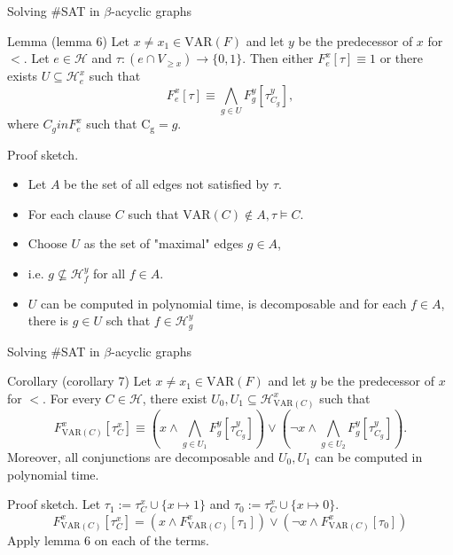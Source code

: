 \begin{frame}[t]{Solving \#SAT in $\beta$-acyclic graphs}
	\begin{block}{Lemma (lemma 6)}
		Let $x \neq x_1 \in \mathrm{VAR}(F)$ and let $y$ be the predecessor of $x$ for $<$.  Let $e \in \mathcal{H}$ and $\tau : (e \cap V_{\geq x}) \rightarrow \{0, 1\}$. Then either $F^x_e[\tau] \equiv 1$ or there exists $U \subseteq \mathcal{H}^x_e$ such that 
		$$ F^x_e[\tau] \equiv \bigwedge\limits_{g \in U} F^y_g[\tau^y_{C_g}],$$
		where $C_g in F^x_e$ such that $\mathrm{C_g} = g$.
	\end{block}
	\pause
	Proof sketch.
	\begin{itemize}[<+->]
		\item Let $A$ be the set of all edges not satisfied by $\tau$. 
		\item For each clause $C$ such that $\mathrm{VAR}(C) \notin A, \tau \models C$.
		\item Choose $U$ as the set of "maximal" edges $g \in A$,
		\item[]\hspace{1cm}i.e. $g \not \subseteq \mathcal{H}^y_f$ for all $f \in A$.
		\item $U$ can be computed in polynomial time, is decomposable and for each $f \in A$, there is $g \in U$ sch that $f \in \mathcal{H}^y_g$
	\end{itemize}
\end{frame}

\begin{frame}[t]{Solving \#SAT in $\beta$-acyclic graphs}
	\begin{block}{Corollary (corollary 7)}
		Let $x \neq x_1 \in \mathrm{VAR}(F)$ and let $y$ be the predecessor of $x$ for $<$. For every $C \in \mathcal{H}$, there exist $U_0, U_1 \subseteq \mathcal{H}^x_{\mathrm{VAR}(C)}$ such that
		$$F^x_{\mathrm{VAR}(C)}[\tau^x_C] \equiv 
		( x \land \bigwedge\limits_{g \in U_1} F^y_g[\tau^y_{C_g}]) \lor
		( \lnot x \land \bigwedge\limits_{g \in U_2} F^y_g[\tau^y_{C_g}]).
		$$
		Moreover, all conjunctions are decomposable and $U_0, U_1$ can be computed in polynomial time.
	\end{block}

	\pause
	Proof sketch. Let $\tau_1 := \tau^x_C \cup \{x \mapsto 1\}$ and $\tau_0 := \tau^x_C \cup \{x \mapsto 0\}$.
	$$F^x_{\mathrm{VAR}(C)}[\tau^x_C] =  (x \land F^x_{\mathrm{VAR}(C)}[\tau_1]) \lor (\lnot x \land F^x_{\mathrm{VAR}(C)}[\tau_0])$$	
		Apply lemma 6 on each of the terms.
\end{frame}

